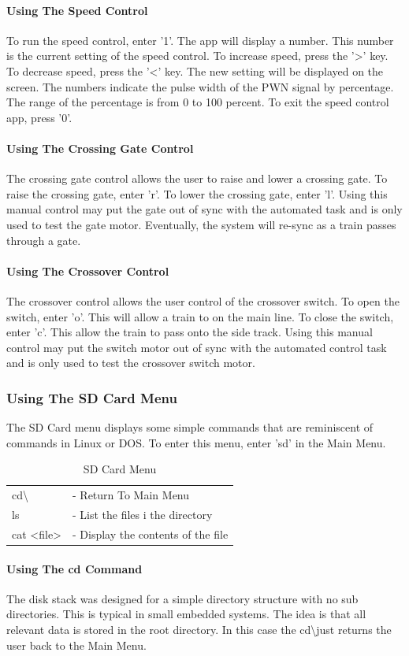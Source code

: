 \documentclass[acmlarge,screen]{acmart}
\begin{document}
\paragraph{Using The Speed Control}
To run the speed control, enter '1'. The app will display a number. This number is the current setting of the speed control. To increase speed, press the '>' key. To decrease speed, press the '<' key. The new setting will be displayed on the screen. The numbers indicate the pulse width of the PWN signal by percentage. The range of the percentage is from 0 to 100 percent. To exit the speed control app, press '0'.
\paragraph{Using The Crossing Gate Control}
The crossing gate control allows the user to raise and lower a crossing gate. To raise the crossing gate, enter 'r'. To lower the crossing gate, enter 'l'. Using this manual control may put the gate out of sync with the automated task and is only used to test the gate motor. Eventually, the system will re-sync as a train
passes through a gate.
\paragraph{Using The Crossover Control}
The crossover control allows the user control of the crossover switch. To open the switch, enter 'o'. This will allow a train to on the main line. To close the switch, enter 'c'. This allow the train to pass onto the side track. Using this manual control may put the switch motor out of sync with the automated control task
and is only used to test the crossover switch motor.
\subsubsection{Using The SD Card Menu}
The SD Card menu displays some simple commands that are reminiscent of commands in Linux or DOS. To enter this menu, enter 'sd' in the Main Menu.
\begin{table}[H]
\begin{tabular}{l l} 
cd\textbackslash & - Return To Main Menu \\
ls & - List the files i the directory\\
cat <file> & - Display the contents of the file\\
\end{tabular} 
\caption{SD Card Menu}
\end{table}
\paragraph{Using The cd Command}
The disk stack was designed for a simple directory structure with no sub directories. This is typical in small embedded systems. The idea is that all relevant data is stored in the root directory. In this case the cd\textbackslash just returns the user back to the Main Menu.
\end{document}
